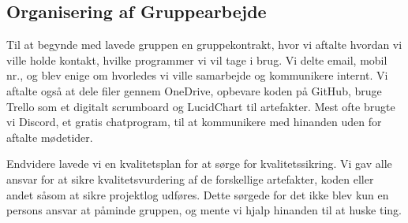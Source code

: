\subsection{Organisering af Gruppearbejde}

Til at begynde med lavede gruppen en gruppekontrakt, hvor vi aftalte hvordan vi ville holde kontakt, hvilke programmer vi vil tage i brug.
Vi delte email, mobil nr., og blev enige om hvorledes vi ville samarbejde og kommunikere internt.
Vi aftalte også at dele filer gennem OneDrive, opbevare koden på GitHub, bruge Trello som et digitalt scrumboard og LucidChart til artefakter.
Mest ofte brugte vi Discord, et gratis chatprogram, til at kommunikere med hinanden uden for aftalte mødetider.

Endvidere lavede vi en kvalitetsplan for at sørge for kvalitetssikring. Vi gav alle ansvar for at sikre kvalitetsvurdering af de forskellige artefakter, koden eller andet såsom at sikre projektlog udføres. Dette sørgede for det ikke blev kun en persons ansvar at påminde gruppen, og mente vi hjalp hinanden til at huske ting.

